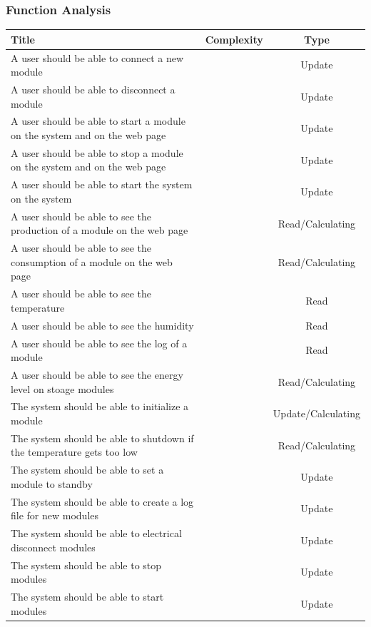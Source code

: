	\subsubsection{Function Analysis}
		
		\begin{table}[h!]
			\begin{tabular}{| l | c | c |}
				\hline
	Title																				& Complexity 	& Type	\\ \hline
	A user should be able to connect a new module										& ~				& Update 				\\ \hline
	A user should be able to disconnect a module										& ~				& Update	 			\\ \hline
	A user should be able to start a module on the system and on the web page			& ~				& Update 				\\ \hline
	A user should be able to stop a module on the system and on the web page			& ~				& Update 				\\ \hline
	A user should be able to start the system on the system								& ~				& Update 				\\ \hline
	A user should be able to see the production of a module on the web page				& ~				& Read/Calculating 		\\ \hline
	A user should be able to see the consumption of a module on the web page			& ~				& Read/Calculating 		\\ \hline
	A user should be able to see the temperature										& ~				& Read 					\\ \hline
	A user should be able to see the humidity											& ~				& Read			 		\\ \hline
	A user should be able to see the log of a module									& ~				& Read			 		\\ \hline
	A user should be able to see the energy level on stoage modules						& ~				& Read/Calculating 		\\ \hline
	The system should be able to initialize a module									& ~				& Update/Calculating 	\\ \hline
	The system should be able to shutdown if the temperature gets too low				& ~				& Read/Calculating 		\\ \hline
	The system should be able to set a module to standby								& ~				& Update 				\\ \hline
	The system should be able to create a log file for new modules						& ~				& Update 				\\ \hline
	The system should be able to electrical disconnect modules							& ~				& Update 				\\ \hline
	The system should be able to stop modules											& ~				& Update	 			\\ \hline
	The system should be able to start modules											& ~				& Update		 		\\ \hline
				\end{tabular}
			\end{table}

